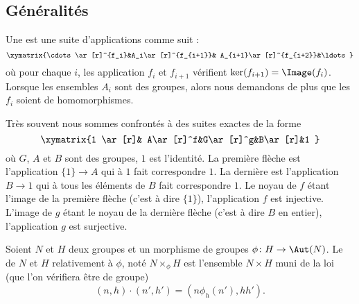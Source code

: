 \subsection{Généralités}

Une  est une suite d'applications comme suit :
\begin{equation}
    \xymatrix{%
    \cdots \ar[r]^{f_i}&A_i\ar[r]^{f_{i+1}}& A_{i+1}\ar[r]^{f_{i+2}}&\ldots
       }
\end{equation}
où pour chaque \( i\), les application \( f_i\) et \( f_{i+1}\) vérifient \( \ker(f_{i+1})=\Image(f_i)\). Lorsque les ensembles \( A_i\) sont des groupes, alors nous demandons de plus que les \( f_i\) soient de homomorphismes.

Très souvent nous sommes confrontés à des suites exactes de la forme
\begin{equation}
    \xymatrix{%
    1 \ar[r]& A\ar[r]^f&G\ar[r]^g&B\ar[r]&1
       }
\end{equation}
où \( G\), \( A\) et \( B\) sont des groupes, \( 1\) est l'identité. La première flèche est l'application \( \{ 1 \}\to A\) qui à \( 1\) fait correspondre \( 1\). La dernière est l'application \( B\to 1\) qui à tous les éléments de \( B\) fait correspondre \( 1\). Le noyau de \( f\) étant l'image de la première flèche (c'est à dire \( \{ 1 \}\)), l'application \( f\) est injective. L'image de \( g\) étant le noyau de la dernière flèche (c'est à dire \( B\) en entier), l'application \( g\) est surjective.

\begin{definition}
    Soient \( N\) et \( H\) deux groupes et un morphisme de groupes \( \phi\colon H\to \Aut(N)\). Le  de \( N\) et \( H\) relativement à \( \phi\), noté \( N\times_{\phi}H\) est l'ensemble \( N\times H\) muni de la loi (que l'on vérifiera être de groupe)
    \begin{equation}\label{EqDRgbBI}
        (n,h)\cdot (n',h')=(n\phi_h(n'),hh').
    \end{equation}
\end{definition}

